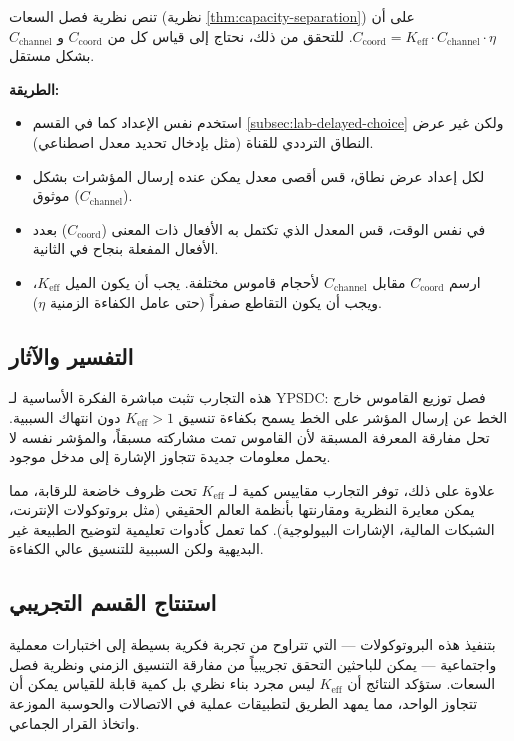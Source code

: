 \documentclass[11pt,a4paper]{article}
\begin{document}
	تنص نظرية فصل السعات (نظرية \ref{thm:capacity-separation}) على أن \(C_{\text{coord}} = K_{\mathrm{eff}} \cdot C_{\text{channel}} \cdot \eta\). للتحقق من ذلك، نحتاج إلى قياس كل من \(C_{\text{coord}}\) و \(C_{\text{channel}}\) بشكل مستقل.
	
	\textbf{الطريقة:}
	\begin{itemize}
		\item استخدم نفس الإعداد كما في القسم \ref{subsec:lab-delayed-choice} ولكن غير عرض النطاق الترددي للقناة (مثل بإدخال تحديد معدل اصطناعي).
		\item لكل إعداد عرض نطاق، قس أقصى معدل يمكن عنده إرسال المؤشرات بشكل موثوق (\(C_{\text{channel}}\)).
		\item في نفس الوقت، قس المعدل الذي تكتمل به الأفعال ذات المعنى (\(C_{\text{coord}}\)) بعدد الأفعال المفعلة بنجاح في الثانية.
		\item ارسم \(C_{\text{coord}}\) مقابل \(C_{\text{channel}}\) لأحجام قاموس مختلفة. يجب أن يكون الميل \(K_{\mathrm{eff}}\)، ويجب أن يكون التقاطع صفراً (حتى عامل الكفاءة الزمنية \(\eta\)).
	\end{itemize}
	
	\subsection{التفسير والآثار}
	
	هذه التجارب تثبت مباشرة الفكرة الأساسية لـ YPSDC: فصل توزيع القاموس خارج الخط عن إرسال المؤشر على الخط يسمح بكفاءة تنسيق \(K_{\mathrm{eff}} > 1\) دون انتهاك السببية. تحل مفارقة المعرفة المسبقة لأن القاموس تمت مشاركته مسبقاً، والمؤشر نفسه لا يحمل معلومات جديدة تتجاوز الإشارة إلى مدخل موجود.
	
	علاوة على ذلك، توفر التجارب مقاييس كمية لـ \(K_{\mathrm{eff}}\) تحت ظروف خاضعة للرقابة، مما يمكن معايرة النظرية ومقارنتها بأنظمة العالم الحقيقي (مثل بروتوكولات الإنترنت، الشبكات المالية، الإشارات البيولوجية). كما تعمل كأدوات تعليمية لتوضيح الطبيعة غير البديهية ولكن السببية للتنسيق عالي الكفاءة.
	
	\subsection{استنتاج القسم التجريبي}
	
	بتنفيذ هذه البروتوكولات — التي تتراوح من تجربة فكرية بسيطة إلى اختبارات معملية واجتماعية — يمكن للباحثين التحقق تجريبياً من مفارقة التنسيق الزمني ونظرية فصل السعات. ستؤكد النتائج أن \(K_{\mathrm{eff}}\) ليس مجرد بناء نظري بل كمية قابلة للقياس يمكن أن تتجاوز الواحد، مما يمهد الطريق لتطبيقات عملية في الاتصالات والحوسبة الموزعة واتخاذ القرار الجماعي.
	
\end{document}
